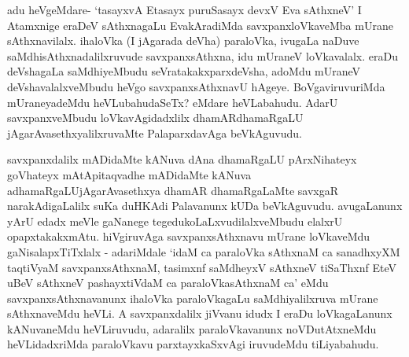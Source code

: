 \begin{artha}
adu heVgeMdare- `tasayxvA Etasayx puruSasayx devxV Eva sAthxneV' I Atamxnige eraDeV sAthxnagaLu EvakAradiMda savxpanxloVkaveMba mUrane sAthxnavilalx. ihaloVka (I jAgarada deVha) paraloVka, ivugaLa naDuve saMdhisAthxnadalilxruvude savxpanxsAthxna, idu mUraneV loVkavalalx. eraDu deVshagaLa saMdhiyeMbudu seVratakakxparxdeVsha, adoMdu mUraneV deVshavalalxveMbudu heVgo savxpanxsAthxnavU hAgeye. BoVgaviruvuriMda mUraneyadeMdu heVLubahudaSeTx? eMdare heVLabahudu. AdarU savxpanxveMbudu loVkavAgidadxlilx dhamARdhamaRgaLU jAgarAvasethxyalilxruvaMte PalaparxdavAga beVkAguvudu. 
\end{artha}

\begin{artha}%
savxpanxdalilx mADidaMte kANuva dAna dhamaRgaLU pArxNihateyx goVhateyx mAtApitaqvadhe mADidaMte kANuva adhamaRgaLU\break jAgarAvasethxya dhamAR dhamaRgaLaMte savxgaR narakAdigaLalilx suKa duHKAdi Palavanunx kUDa beVkAguvudu. avugaLanunx yArU edadx meVle gaNanege tegedukoLaLxvudilalxveMbudu elalxrU opapxtakakxmAtu. hiVgiruvAga savxpanxsAthxnavu mUrane loVkaveMdu gaNisalapxTiTxlalx - adariMdale `idaM ca paraloVka sAthxnaM ca sanadhxyXM taqtiVyaM savxpanxsAthxnaM, tasimxnf saMdheyxV sAthxneV tiSaThxnf EteV uBeV sAthxneV pashayxtiVdaM ca paraloVkasAthxnaM ca' eMdu savxpanxsAthxnavanunx ihaloVka paraloVkagaLu saMdhiyalilxruva mUrane sAthxnaveMdu heVLi. A savxpanxdalilx jiVvanu idudx I eraDu loVkagaLanunx kANuvaneMdu heVLiruvudu, adaralilx paraloVkavanunx noVDutAtxneMdu heVLidadxriMda paraloVkavu parxtayxkaSxvAgi iruvudeMdu tiLiyabahudu. 
\end{artha}

